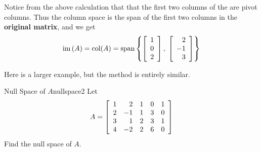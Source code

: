 \begin{solution}
Notice from the above calculation that that the first two columns of the {\rref} are pivot
columns. Thus the  column space is the span of the first two  columns in
the \textbf{original matrix}, and we get 
\begin{equation*}
\mbox{im}\left( A\right) = \mbox{col}(A) =
\mbox{span} \left\{ \left[ 
\begin{array}{r}
1 \\ 
0 \\ 
2 
\end{array}
\right], \; \left[ 
\begin{array}{r}
2 \\ 
-1 \\ 
3 
\end{array}
\right]  \right\}
\end{equation*}

\end{solution}

Here is a larger example, but the method is entirely similar.

\begin{example}{Null Space of $A$}{nullspace2}
Let
\begin{equation*}
A=\left[
\begin{array}{rrrrr}
1 & 2 & 1 & 0 & 1 \\
2 & -1 & 1 & 3 & 0 \\
3 & 1 & 2 & 3 & 1 \\
4 & -2 & 2 & 6 & 0
\end{array}
\right]
\end{equation*}
Find the null space of $A$.
\end{example}

